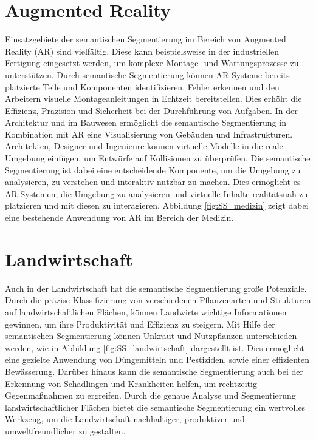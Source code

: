 \section{Augmented Reality}
Einsatzgebiete der semantischen Segmentierung im Bereich von Augmented Reality
(AR) sind vielfältig. Diese kann beispielsweise in der industriellen Fertigung
eingesetzt werden, um komplexe Montage- und Wartungsprozesse zu unterstützen.
Durch semantische Segmentierung können AR-Systeme bereits platzierte Teile und
Komponenten identifizieren, Fehler erkennen und den Arbeitern visuelle
Montageanleitungen in Echtzeit bereitstellen. Dies erhöht die Effizienz,
Präzision und Sicherheit bei der Durchführung von Aufgaben. In der Architektur
und im Bauwesen ermöglicht die semantische Segmentierung in Kombination mit AR
eine Visualisierung von Gebäuden und Infrastrukturen. Architekten, Designer und
Ingenieure können virtuelle Modelle in die reale Umgebung einfügen, um Entwürfe
auf Kollisionen zu überprüfen. Die semantische Segmentierung ist dabei eine
entscheidende Komponente, um die Umgebung zu analysieren, zu verstehen und
interaktiv nutzbar zu machen. Dies ermöglicht es AR-Systemen, die Umgebung zu
analysieren und virtuelle Inhalte realitätsnah zu platzieren und mit diesen zu
interagieren. Abbildung \ref{fig:SS_medizin} zeigt dabei eine bestehende
Anwendung von AR im Bereich der Medizin. \cite{nee2012augmented,ko2020novel}

\section{Landwirtschaft}

Auch in der Landwirtschaft hat die semantische Segmentierung große Potenziale.
Durch die präzise Klassifizierung von verschiedenen Pflanzenarten und
Strukturen auf landwirtschaftlichen Flächen, können Landwirte wichtige
Informationen gewinnen, um ihre Produktivität und Effizienz zu steigern. Mit
Hilfe der semantischen Segmentierung können Unkraut und Nutzpflanzen
unterschieden werden, wie in Abbildung \ref{fig:SS_landwirtschaft} dargestellt
ist. Dies ermöglicht eine gezielte Anwendung von Düngemitteln und Pestiziden,
sowie einer effizienten Bewässerung. Darüber hinaus kann die semantische
Segmentierung auch bei der Erkennung von Schädlingen und Krankheiten helfen, um
rechtzeitig Gegenmaßnahmen zu ergreifen. Durch die genaue Analyse und
Segmentierung landwirtschaftlicher Flächen bietet die semantische Segmentierung
ein wertvolles Werkzeug, um die Landwirtschaft nachhaltiger, produktiver und
umweltfreundlicher zu gestalten. \cite{8460962}

